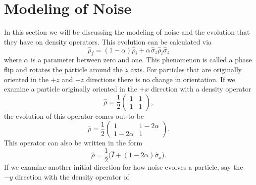 \documentclass[twocolumn]{article}
\begin{document}
\section*{Modeling of Noise}
In this section we will be discussing the modeling of noise and the evolution that they have on density operators. This evolution can be calculated via
\begin{equation} \label{eq:80}
\hat{\rho}_f=(1-\alpha)\hat{\rho}_i+\alpha\hspace{1pt}\hat{\sigma}_z\hat{\rho}_i\hat{\sigma}_z
\end{equation}
where $\alpha$ is a parameter between zero and one. This phenomenon is called a phase flip and rotates the particle around the $z$ axis. For particles that are originally oriented in the $+z$ and $-z$ directions there is no change in orientation. If we examine a particle originally oriented in the $+x$ direction with a density operator 
\begin{equation} \label{eq:81}
\hat{\rho}=\frac{1}{2}
\begin{pmatrix}
1 & 1 \\
1 & 1
\end{pmatrix},
\end{equation}
the evolution of this operator comes out to be
\begin{equation} \label{eq:82}
\hat{\rho}=\frac{1}{2}
\begin{pmatrix}
1 & 1-2\alpha \\
1-2\alpha & 1
\end{pmatrix}.
\end{equation}
This operator can also be written in the form
\begin{equation} \label{eq:83}
\hat{\rho}=\frac{1}{2}\big(\hat{I}+(1-2\alpha)\hat{\sigma}_x\big).
\end{equation}
If we examine another initial direction for how noise evolves a particle, say the $-y$ direction with the density operator of 
\end{document}
